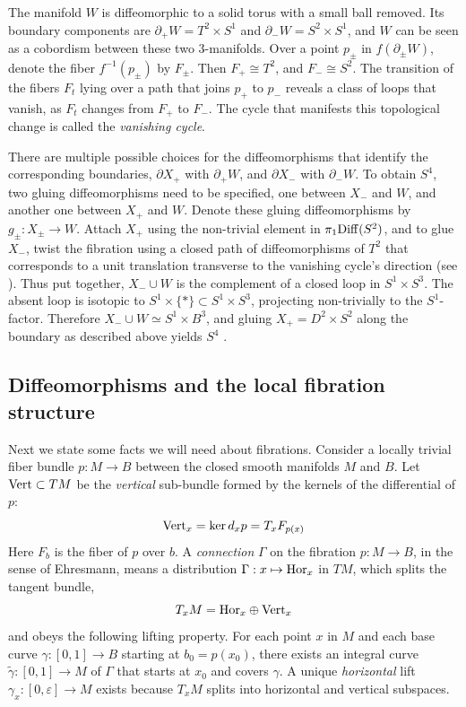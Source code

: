 \documentclass{amsart}
\begin{document}
 The manifold $W$ is diffeomorphic to a solid torus with a small ball removed. 
 Its boundary components are $\partial_{+}W = T^{2}\times S^1$ and $\partial_{-}W = S^{2}\times S^1$, and $W$ can be seen as a cobordism between these two $3$-manifolds. 
 Over a point $p_{\pm}$ in $f(\partial_{\pm}W )$, denote the fiber $f^{-1}(p_{\pm})$ by $F_{\pm}$. Then $F_{+}\cong T^2$, and $F_{-}\cong S^2$. 
 The transition of the fibers $F_{t}$ lying over a path that joins $p_{+}$ to $p_{-}$ reveals a class of loops that vanish, as $F_{t}$ changes from $F_{+}$ to $F_{-}$. 
 The cycle that manifests this topological change is called the {\it  vanishing cycle}. 
 
 There are multiple possible choices for the diffeomorphisms that identify the corresponding boundaries,  $\partial X_{+}$ with $\partial_{+}W$, and $\partial X_{-}$ with $\partial_{-}W$. 
 To obtain $S^4$, two gluing diffeomorphisms need to be specified, one between $X_{-}$ and $W$, and another one between $X_{+}$ and $W$.
  Denote  these gluing diffeomorphisms by $g_{\pm}:X_{\pm}\to W$.
  Attach $X_{+}$ using the non-trivial element in $\pi_1 {\rm Diff}(S^2)$, and to glue $X_{-}$, twist the fibration using a closed path of diffeomorphisms of $T^2$ that corresponds to a unit translation transverse to the vanishing cycle's direction (see \cite{ADK05}). 
Thus put together, $X_{-}\cup W$ is the complement of a closed loop in $S^1\times S^3$. 
The absent loop is isotopic to $S^1\times \{ \ast \} \subset S^1 \times S^3$, projecting non-trivially to the $S^1$-factor.
 Therefore $X_{-}\cup W\simeq S^1\times B^3$, and gluing $X_{+}=D^2\times S^2$ along the boundary as described above yields $S^4$ \cite{ADK05}.



\subsection*{Diffeomorphisms and the local fibration structure}

Next we state some facts we will need about fibrations. 
Consider a locally trivial fiber bundle $p:M\to B$ between the closed smooth manifolds $M$ and $B$. Let ${\rm Vert }\subset TM$ be the {\it vertical} sub-bundle formed by the kernels of the differential of $p$:
\[
{\rm Vert }_{x} = \ker d_{x}p = T_{x}F_{p(x)}
\]
Here $F_{b}$ is the fiber of $p$ over $b$. A {\it connection} $\Gamma$ on the fibration $p:M\to B$, in the sense of Ehresmann, means a distribution $\Gamma : x \mapsto {\rm Hor}_{x}$ in $TM$, which splits the tangent bundle,
\[
T_{x}M = {\rm Hor}_{x} \oplus {\rm Vert }_{x}
\]
and obeys the following lifting property. For each point $x$ in $M$ and each base curve $\gamma:[0,1]\to B$ starting at $b_0 = p(x_0)$, there exists an integral curve $\tilde{\gamma}: [0,1]\to  M$ of $\Gamma$ that starts at $x_0$ and covers $\gamma$. A unique {\it horizontal} lift $\gamma_{x}: [0,\varepsilon]\to M$ exists because $T_{x}M$ splits into horizontal and vertical subspaces. %
\end{document}
